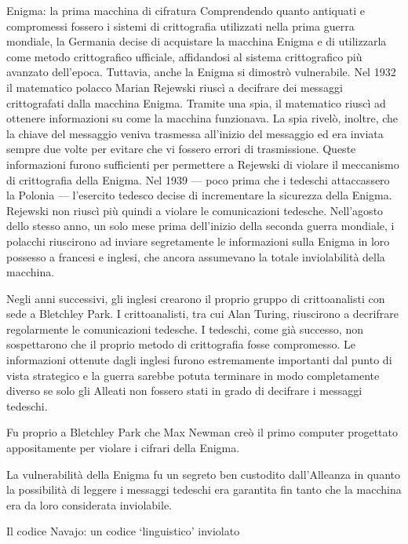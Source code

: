 \documentclass[final,hyperref={pdfpagelabels=false}]{beamer}
\begin{document}
\begin{frame}{}
\begin{columns}[t]
\begin{column}{.3\linewidth}
\begin{block}{Enigma: la prima macchina di cifratura}
          Comprendendo quanto antiquati e compromessi fossero i sistemi di crittografia utilizzati nella prima guerra mondiale, la Germania decise di acquistare la macchina Enigma e di utilizzarla come metodo crittografico ufficiale, affidandosi al sistema crittografico più avanzato dell'epoca. Tuttavia, anche la Enigma si dimostrò vulnerabile. Nel 1932 il matematico polacco Marian Rejewski riuscì a decifrare dei messaggi crittografati dalla macchina Enigma. Tramite una spia, il matematico riuscì ad ottenere informazioni su come la macchina funzionava. La spia rivelò, inoltre, che la chiave del messaggio veniva trasmessa all'inizio del messaggio ed era inviata sempre due volte per evitare che vi fossero errori di trasmissione. Queste informazioni furono sufficienti per permettere a Rejewski di violare il meccanismo di crittografia della Enigma. Nel 1939 --- poco prima che i tedeschi attaccassero la Polonia --- l'esercito tedesco decise di incrementare la sicurezza della Enigma. Rejewski non riuscì più quindi a violare le comunicazioni tedesche. Nell'agosto dello stesso anno, un solo mese prima dell'inizio della seconda guerra mondiale, i polacchi riuscirono ad inviare segretamente le informazioni sulla Enigma in loro possesso a francesi e inglesi, che ancora assumevano la totale inviolabilità della macchina. \par
          Negli anni successivi, gli inglesi crearono il proprio gruppo di crittoanalisti con sede a Bletchley Park. I crittoanalisti, tra cui Alan Turing, riuscirono  a decrifrare regolarmente le comunicazioni tedesche. I tedeschi, come già successo, non sospettarono che il proprio metodo di crittografia fosse compromesso. Le informazioni ottenute dagli inglesi furono estremamente importanti dal punto di vista strategico e la guerra sarebbe potuta terminare in modo completamente diverso se solo gli Alleati non fossero stati in grado di decifrare i messaggi tedeschi. \par
          Fu proprio a Bletchley Park che Max Newman creò il primo computer progettato appositamente per violare i cifrari della Enigma.\par
          La vulnerabilità della Enigma fu un segreto ben custodito dall'Alleanza in quanto la possibilità di leggere i messaggi tedeschi era garantita fin tanto che la macchina era da loro considerata inviolabile.
        \end{block}
        \begin{block}{Il codice Navajo: un codice `linguistico' inviolato}

\end{block}
\end{column}
\end{columns}
\end{frame}
\end{document}
